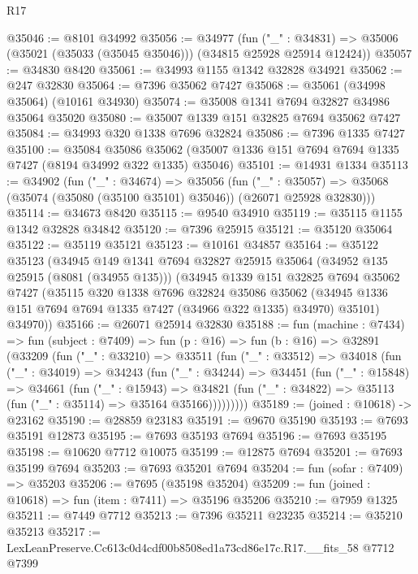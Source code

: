 \begin{lexlean}{R17}
\begin{coremodule}
@35046 := @8101 @34992
@35056 := @34977
    (fun ("_" : @34831) => @35006 (@35021 (@35033 (@35045 @35046))) (@34815 @25928 @25914 @12424))
@35057 := @34830 @8420
@35061 := @34993 @1155 @1342 @32828 @34921
@35062 := @247 @32830
@35064 := @7396 @35062 @7427
@35068 := @35061 (@34998 @35064) (@10161 @34930)
@35074 := @35008 @1341 @7694 @32827 @34986 @35064 @35020
@35080 := @35007 @1339 @151 @32825 @7694 @35062 @7427
@35084 := @34993 @320 @1338 @7696 @32824
@35086 := @7396 @1335 @7427
@35100 := @35084
    @35086
    @35062
    (@35007 @1336 @151 @7694 @7694 @1335 @7427 (@8194 @34992 @322 @1335) @35046)
@35101 := @14931 @1334
@35113 := @34902
    (fun ("_" : @34674) =>
    @35056
      (fun ("_" : @35057) =>
      @35068 (@35074 (@35080 (@35100 @35101) @35046)) (@26071 @25928 @32830)))
@35114 := @34673 @8420
@35115 := @9540 @34910
@35119 := @35115 @1155 @1342 @32828 @34842
@35120 := @7396 @25915
@35121 := @35120 @35064
@35122 := @35119 @35121
@35123 := @10161 @34857
@35164 := @35122
    @35123
    (@34945
      @149
      @1341
      @7694
      @32827
      @25915
      @35064
      (@34952 @135 @25915 (@8081 (@34955 @135)))
      (@34945
        @1339
        @151
        @32825
        @7694
        @35062
        @7427
        (@35115
          @320
          @1338
          @7696
          @32824
          @35086
          @35062
          (@34945 @1336 @151 @7694 @7694 @1335 @7427 (@34966 @322 @1335) @34970)
          @35101)
        @34970))
@35166 := @26071 @25914 @32830
@35188 := fun (machine : @7434) =>
  fun (subject : @7409) =>
  fun (p : @16) =>
  fun (b : @16) =>
  @32891
    (@33209
      (fun ("_" : @33210) =>
      @33511
        (fun ("_" : @33512) =>
        @34018
          (fun ("_" : @34019) =>
          @34243
            (fun ("_" : @34244) =>
            @34451
              (fun ("_" : @15848) =>
              @34661
                (fun ("_" : @15943) =>
                @34821 (fun ("_" : @34822) => @35113 (fun ("_" : @35114) => @35164 @35166)))))))))
@35189 := (joined : @10618) -> @23162
@35190 := @28859 @23183
@35191 := @9670 @35190
@35193 := @7693 @35191 @12873
@35195 := @7693 @35193 @7694
@35196 := @7693 @35195
@35198 := @10620 @7712 @10075
@35199 := @12875 @7694
@35201 := @7693 @35199 @7694
@35203 := @7693 @35201 @7694
@35204 := fun (sofar : @7409) => @35203
@35206 := @7695 (@35198 @35204)
@35209 := fun (joined : @10618) => fun (item : @7411) => @35196 @35206
@35210 := @7959 @1325
@35211 := @7449 @7712
@35213 := @7396 @35211 @23235
@35214 := @35210 @35213
@35217 := LexLeanPreserve.Cc613c0d4cdf00b8508ed1a73cd86e17c.R17.__fits_58 @7712 @7399

\end{coremodule}
\end{lexlean}
